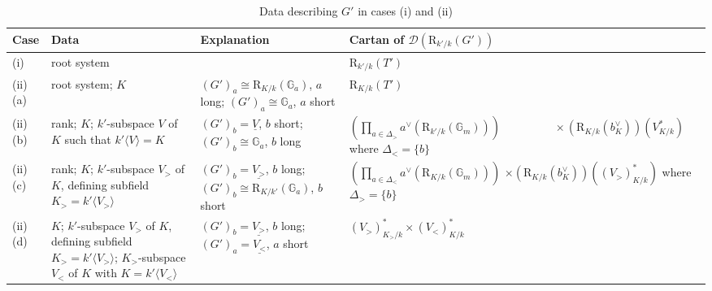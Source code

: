 \documentclass[11pt,reqno]{amsart}
\theoremstyle{definition}
\theoremstyle{remark}
\theoremstyle{definition}
\theoremstyle{plain}
\newcommand{\R}{\mathrm{R}}
\newcommand{\D}{\mathscr{D}}
\newcommand{\Gm}{\mathbb{G}_m}
\newcommand{\Ga}{\mathbb{G}_a}
\renewcommand{\D}{\mathscr{D}}
\begin{document}
\begin{table}\small \begin{tabular}{l|l|l|l}
Case & Data & Explanation & Cartan of $\D(\R_{k'/k}(G'))$ \\\hline\hline
(i) & root system & & $\R_{k'/k}(T')$\\\hline

(ii)(a) & \parbox[t]{0.22\textwidth}{root system; $K$} & 
\parbox[t]{0.25\textwidth}{$(G')_a\cong \R_{K/k}(\Ga)$, $a$ long;\\ $(G')_a\cong \Ga$,  $a$ short} & $\R_{K/k}(T')$\\\hline

(ii)(b) & \parbox[t]{0.22\textwidth}{rank; $K$; \\ $k'$-subspace $V$ of $K$\\ such that $k'\langle V\rangle = K$} & 
\parbox[t]{0.25\textwidth}{$(G')_b=\underline{V}$, $b$ short; \\ $(G')_b\cong \Ga$, $b$ long} & 
\parbox[t]{0.37\textwidth}{$\left(\prod_{a\in\Delta_>} a^\vee (\R_{k'/k}(\Gm))\right) \\\phantom{something}\times (\R_{K/k}(b_K^\vee))(V_{K/k}^*)$\\where $\Delta_<=\{b\}$}\\\hline

(ii)(c) & \parbox[t]{0.22\textwidth}{rank; $K$; \\ $k'$-subspace $V_>$ of $K$,\\defining subfield\\ $K_>=k'\langle V_>\rangle$} & 
\parbox[t]{0.25\textwidth}{$(G')_b=\underline{V_>}$, $b$ long;\\ $(G')_b\cong \R_{K/k'}(\Ga)$, $b$ short} & \parbox[t]{0.37\textwidth}{$\left(\prod_{a\in\Delta_<} a^\vee (\R_{K/k}(\Gm))\right)$ \\ \phantom{something} $\times (\R_{K/k}(b_K^\vee))((V_>)_{K/k}^*)$ \\where $\Delta_>=\{b\}$}\\\hline

(ii)(d) & \parbox[t]{0.22\textwidth}{$K$; \\ $k'$-subspace $V_>$ of $K$,\\defining subfield\\ $K_>=k'\langle V_>\rangle$;\\
$K_>$-subspace $V_<$ of $K$\\ with $K=k'\langle V_<\rangle$} & 
\parbox[t]{0.25\textwidth}{$(G')_b=\underline{V_>}$, $b$ long;\\
$(G')_a=\underline{V_<}$, $a$ short} & 
\parbox[t]{0.32\textwidth}{$(V_>)_{K_>/k}^*\times (V_<)^*_{K/k}$}\\\hline
\end{tabular}\caption{Data describing $G'$ in cases (i) and (ii)\label{tabledata}}\end{table}
\end{document}
